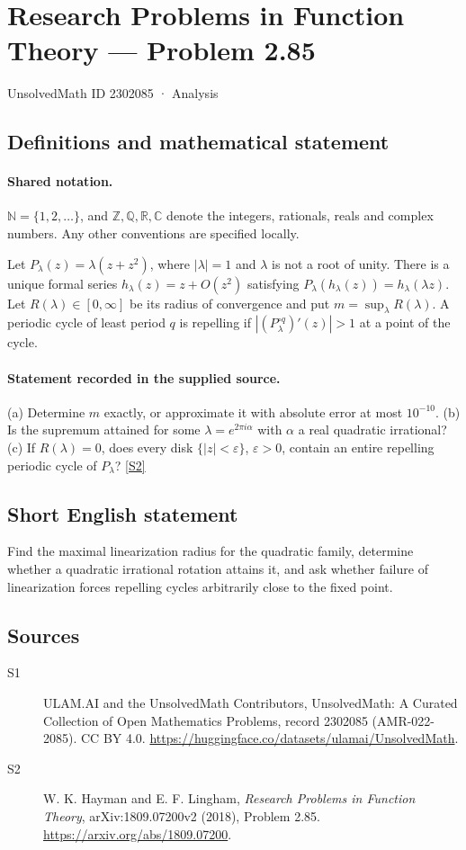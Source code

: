 \documentclass[11pt]{article}
\newcommand{\sref}[2]{\hyperlink{source:#1:#2}{[S#2]}}
\begin{document}
\setcounter{section}{2302084}
\section{Research Problems in Function Theory — Problem 2.85}\label{2302085}
{\small\sffamily UnsolvedMath ID 2302085 · Analysis}
\subsection{Definitions and mathematical statement}

\paragraph{Shared notation.}$\mathbb N=\{1,2,\ldots\}$, and $\mathbb Z,\mathbb Q,\mathbb R,\mathbb C$ denote the integers, rationals, reals and complex numbers. Any other conventions are specified locally.


Let $P_\lambda(z)=\lambda(z+z^2)$, where $|\lambda|=1$ and $\lambda$ is not a root of unity. There is a unique formal series $h_\lambda(z)=z+O(z^2)$ satisfying $P_\lambda(h_\lambda(z))=h_\lambda(\lambda z)$. Let $R(\lambda)\in[0,\infty]$ be its radius of convergence and put $m=\sup_\lambda R(\lambda)$. A periodic cycle of least period $q$ is repelling if $|(P_\lambda^{\circ q})'(z)|>1$ at a point of the cycle.
\paragraph{Statement recorded in the supplied source.}
(a) Determine $m$ exactly, or approximate it with absolute error at most $10^{-10}$. (b) Is the supremum attained for some $\lambda=e^{2\pi i\alpha}$ with $\alpha$ a real quadratic irrational? (c) If $R(\lambda)=0$, does every disk $\{|z|<\varepsilon\}$, $\varepsilon>0$, contain an entire repelling periodic cycle of $P_\lambda$? \sref{2302085}{2}
\subsection{Short English statement}
Find the maximal linearization radius for the quadratic family, determine whether a quadratic irrational rotation attains it, and ask whether failure of linearization forces repelling cycles arbitrarily close to the fixed point.
\subsection{Sources}
\begin{description}
\item[\hypertarget{source:2302085:1}{S1}] ULAM.AI and the UnsolvedMath Contributors, UnsolvedMath: A Curated Collection of Open Mathematics Problems, record 2302085 (AMR-022-2085). CC BY 4.0. \url{https://huggingface.co/datasets/ulamai/UnsolvedMath}.
\item[\hypertarget{source:2302085:2}{S2}] W. K. Hayman and E. F. Lingham, \emph{Research Problems in Function Theory}, arXiv:1809.07200v2 (2018), Problem 2.85. \url{https://arxiv.org/abs/1809.07200}.
\end{description}
\label{end:2302085}
\end{document}
